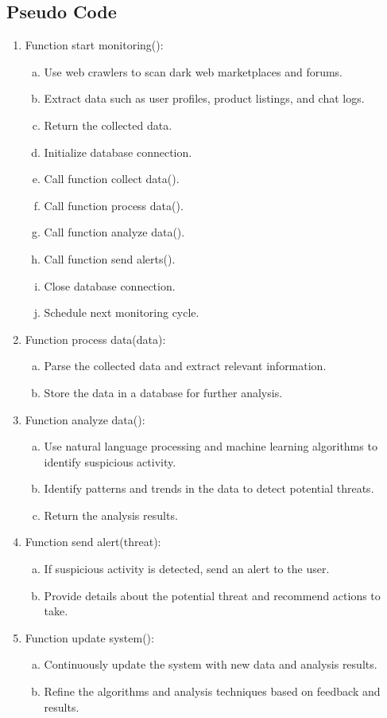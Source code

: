 \documentclass[10pt]{report}
\begin{document}
\subsection{Pseudo Code}
\begin{enumerate}
    \item Function start monitoring():
    \begin{enumerate}[a)]
        \item Use web crawlers to scan dark web marketplaces and forums.
        \item Extract data such as user profiles, product listings, and chat logs.
        \item Return the collected data.
        \item Initialize database connection.
        \item Call function collect data().
        \item Call function process data().
        \item Call function analyze data().
        \item Call function send alerts().
        \item Close database connection.
        \item Schedule next monitoring cycle.
    \end{enumerate}
    \item Function process data(data):
    \begin{enumerate}[a)]
        \item Parse the collected data and extract relevant information.
        \item Store the data in a database for further analysis.
    \end{enumerate}
    \item Function analyze data():
    \begin{enumerate}[a)]
        \item  Use natural language processing and machine learning algorithms to identify suspicious activity.
        \item Identify patterns and trends in the data to detect potential threats.
        \item Return the analysis results.
    \end{enumerate}
    \item Function send alert(threat):
    \begin{enumerate}[a)]
        \item If suspicious activity is detected, send an alert to the user.
        \item Provide details about the potential threat and recommend actions to take.
    \end{enumerate}
    \item Function update system():
    \begin{enumerate}[a)]
        \item Continuously update the system with new data and analysis results.
        \item Refine the algorithms and analysis techniques based on feedback and results.
    \end{enumerate}
\end{enumerate}
\end{document}
